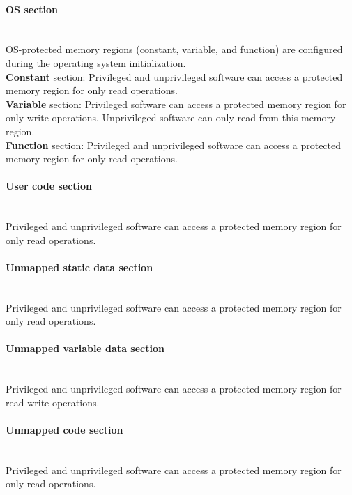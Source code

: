 \paragraph{OS section}\label{programMemoryProtection}\mbox{}\\
\indent OS-protected memory regions (constant, variable, and function) are configured during the operating system initialization.\\

\textbf{Constant} section: Privileged and unprivileged software can access a protected memory region for only read operations.\\

\textbf{Variable} section: Privileged software can access a protected memory region for only write operations. Unprivileged software can only read from this memory region.\\

\textbf{Function} section: Privileged and unprivileged software can access a protected memory region for only read operations.

\paragraph{User code section}\label{userCodeMemoryProtection}\mbox{}\\
\indent Privileged and unprivileged software can access a protected memory region for only read operations.

\paragraph{Unmapped static data section}\label{userStaticDataMemoryProtection}\mbox{}\\
\indent Privileged and unprivileged software can access a protected memory region for only read operations.

\paragraph{Unmapped variable data section}\mbox{}\\
\indent Privileged and unprivileged software can access a protected memory region for read-write operations.

\paragraph{Unmapped code section}\label{unmappedCodeParagraph}\mbox{}\\
\indent Privileged and unprivileged software can access a protected memory region for only read operations.


